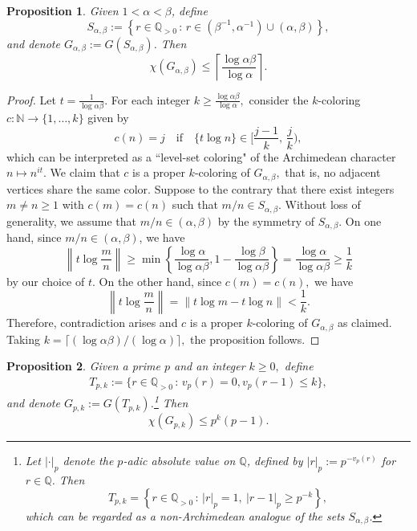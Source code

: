 \documentclass[12pt, reqno, a4paper]{amsart}
\newtheorem{proposition}{Proposition}[section]
\theoremstyle{definition}
\theoremstyle{remark}
\numberwithin{equation}{section}
\newcommand{\N}{\mathbb{N}}
\newcommand{\Z}{\mathbb{Z}}
\renewcommand{\leq}{\leqslant}
\renewcommand{\geq}{\geqslant}
\begin{document}
\begin{proposition} \label{prop:1}
Given \( 1 < \alpha < \beta \), define
\[
S_{\alpha,\beta} := \left\{ r \in \mathbb{Q}_{>0} \,:\, r \in (\beta^{-1}, \alpha^{-1}) \cup (\alpha, \beta) \right\},
\]
and denote \( G_{\alpha,\beta} := G(S_{\alpha,\beta}) \). Then
\[
\chi(G_{\alpha,\beta}) \leq \left\lceil \frac{\log \alpha\beta}{\log \alpha} \right\rceil .
\]
\end{proposition}

\begin{proof}
Let $t = \frac{1}{\log\alpha\beta}$. For each integer $k \geq \frac{\log \alpha\beta}{\log \alpha},$ consider the $k$-coloring $c:\N\to \{1,\ldots,k\}$ given by
  \[ c(n) = j \quad\text{if}\quad \{t\log n\} \in \bigg[\frac{j-1}{k},\, \frac{j}{k} \bigg), \]
which can be interpreted as a ``level-set coloring" of the Archimedean character $n \mapsto n^{it}.$
We claim that $c$ is a proper $k$-coloring of $G_{\alpha,\beta},$ that is, no adjacent vertices share the same color. Suppose to the contrary that there exist integers $m \neq n \geq 1$ with $c(m)=c(n)$ such that 
$m/n \in S_{\alpha,\beta}.$ Without loss of generality, we assume that $m/n \in (\alpha,\beta)$ by the symmetry of $S_{\alpha,\beta}.$ 
On one hand, since $m/n \in (\alpha,\beta)$, we have 
  \[ \left\lVert t\log \frac{m}{n} \right\rVert \geq \min\left\{\frac{\log \alpha}{\log \alpha\beta}, 1-\frac{\log \beta}{\log \alpha\beta} \right\} = \frac{\log \alpha}{\log \alpha\beta} \geq \frac{1}{k}\] 
by our choice of $t.$ 
On the other hand, since $c(m)=c(n),$ we have 
  \[ \left\lVert t\log \frac{m}{n} \right\rVert = \left\lVert t\log m - t\log n \right\rVert < \frac{1}{k}. \]
Therefore, contradiction arises and $c$ is a proper $k$-coloring of $G_{\alpha,\beta}$ as claimed. Taking 
$k=\lceil (\log \alpha\beta)/(\log \alpha) \rceil,$ the proposition follows.
\end{proof}

\begin{proposition} \label{prop:2}
Given a prime $p$ and an integer $k \geq 0,$ define
\begin{align*}
T_{p,k}:=\{ r \in \mathbb{Q}_{>0} \,:\, v_p(r)=0, v_p(r-1) \leq k \},
\end{align*}
and denote \( G_{p,k} := G(T_{p,k}) \).\footnote{ Let \( | \cdot |_p \) denote the \( p \)-adic absolute value on \( \mathbb{Q} \), defined by \( |r|_p := p^{-v_p(r)} \) for \( r \in \mathbb{Q} \). Then  
\[
T_{p,k} = \left\{ r \in \mathbb{Q}_{>0} \,:\, |r|_p = 1,\ |r - 1|_p \geq p^{-k} \right\},
\]
which can be regarded as a non-Archimedean analogue of the sets \( S_{\alpha, \beta} \).
} Then
\[
\chi(G_{p,k}) \leq p^k(p-1).
\]
\end{proposition}
\end{document}
